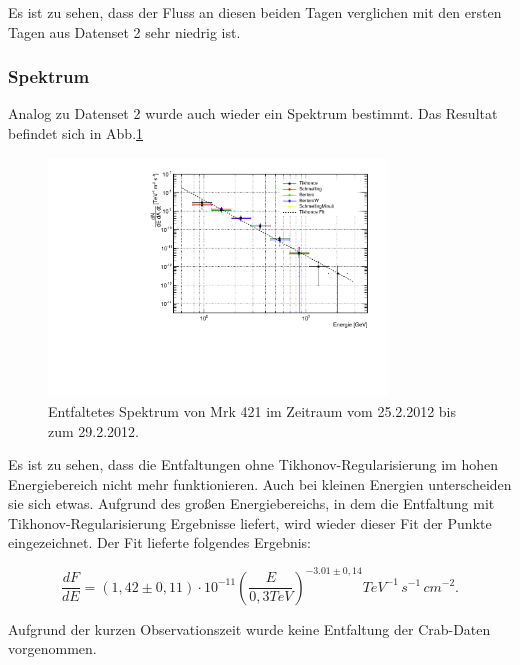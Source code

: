 Es ist zu sehen, dass der Fluss an diesen beiden Tagen verglichen mit den ersten Tagen aus Datenset 2 sehr niedrig ist.



\FloatBarrier

\subsubsection{Spektrum}
Analog zu Datenset 2 wurde auch wieder ein Spektrum bestimmt.
Das Resultat befindet sich in Abb.\ref{Datenset1_Spektrum_Mrk421}

\begin{figure}
    \centering
    \includegraphics[width=0.8\textwidth]{./Plots/04_MrkAnalyse/Datenset1/Spektrum_Mrk421.pdf}
    \caption{Entfaltetes Spektrum von Mrk 421 im Zeitraum vom 25.2.2012 bis zum 29.2.2012.}
    \label{Datenset1_Spektrum_Mrk421}
\end{figure}

Es ist zu sehen, dass die Entfaltungen ohne Tikhonov-Regularisierung im hohen Energiebereich nicht mehr funktionieren.
Auch bei kleinen Energien unterscheiden sie sich etwas.
Aufgrund des großen Energiebereichs, in dem die Entfaltung mit Tikhonov-Regularisierung Ergebnisse liefert, wird wieder dieser Fit der Punkte eingezeichnet.
Der Fit lieferte folgendes Ergebnis:

\begin{equation}
 \frac{dF}{dE}=(1,42 \pm 0,11) \cdot 10^{-11}\left( \frac{E}{0,3 \si{TeV}} \right)^{-3.01\pm 0,14} \si{TeV^{-1}\,s^{-1}\,cm^{-2}}.
\end{equation}

Aufgrund der kurzen Observationszeit wurde keine Entfaltung der Crab-Daten vorgenommen.

\FloatBarrier

